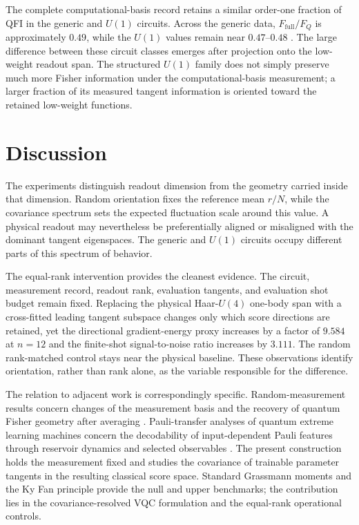 The complete computational-basis record retains a similar order-one fraction of QFI in the generic and $U(1)$ circuits. Across the generic data, $F_{\mathrm{full}}/F_Q$ is approximately $0.49$, while the $U(1)$ values remain near $0.47$--$0.48$ \cite{AitHaddou2026MeasurementAccessible}. The large difference between these circuit classes emerges after projection onto the low-weight readout span. The structured $U(1)$ family does not simply preserve much more Fisher information under the computational-basis measurement; a larger fraction of its measured tangent information is oriented toward the retained low-weight functions.

\section{Discussion}

The experiments distinguish readout dimension from the geometry carried inside that dimension. Random orientation fixes the reference mean $r/N$, while the covariance spectrum sets the expected fluctuation scale around this value. A physical readout may nevertheless be preferentially aligned or misaligned with the dominant tangent eigenspaces. The generic and $U(1)$ circuits occupy different parts of this spectrum of behavior.

The equal-rank intervention provides the cleanest evidence. The circuit, measurement record, readout rank, evaluation tangents, and evaluation shot budget remain fixed. Replacing the physical Haar-$U(4)$ one-body span with a cross-fitted leading tangent subspace changes only which score directions are retained, yet the directional gradient-energy proxy increases by a factor of $9.584$ at $n=12$ and the finite-shot signal-to-noise ratio increases by $3.111$. The random rank-matched control stays near the physical baseline. These observations identify orientation, rather than rank alone, as the variable responsible for the difference.

The relation to adjacent work is correspondingly specific. Random-measurement results concern changes of the measurement basis and the recovery of quantum Fisher geometry after averaging \cite{LuSha2025}. Pauli-transfer analyses of quantum extreme learning machines concern the decodability of input-dependent Pauli features through reservoir dynamics and selected observables \cite{GrossRieser2026}. The present construction holds the measurement fixed and studies the covariance of trainable parameter tangents in the resulting classical score space. Standard Grassmann moments and the Ky Fan principle provide the null and upper benchmarks; the contribution lies in the covariance-resolved VQC formulation and the equal-rank operational controls.

